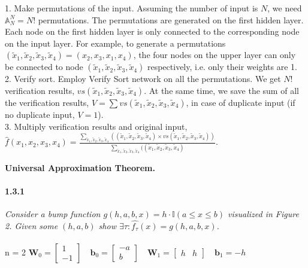 \documentclass{myhw}
\begin{document}
\begin{homeworkProblem}
\begin{homeworkSection}
1. Make permutations of the input. Assuming the number of input is $N$, we need $\mathbb{A}_N^N = N!$ permutations. The permutations are generated on the first hidden layer. Each node on the first hidden layer is only connected to the corresponding node on the input layer. For example, to generate a permutations $(\tilde{x}_1, \tilde{x}_2, \tilde{x}_3, \tilde{x}_4) = (x_2, x_3, x_1, x_4)$, the four nodes on the upper layer can only be connected to node $(\tilde{x}_1, \tilde{x}_2, \tilde{x}_3, \tilde{x}_4)$ respectively, i.e. only their weights are 1. \\
2. Verify sort. Employ Verify Sort network on all the permutations. We get $N!$ verification results, $vs(\tilde{x}_1, \tilde{x}_2, \tilde{x}_3, \tilde{x}_4)$. At the same time, we save the sum of all the verification results, $V = \sum vs(\tilde{x}_1, \tilde{x}_2, \tilde{x}_3, \tilde{x}_4)$, in case of duplicate input (if no duplicate input, $V = 1$).\\
3. Multiply verification results and original input, $\hat{f}(x_1, x_2, x_3, x_4) = \frac{\sum_{\tilde{x}_1, \tilde{x}_2, \tilde{x}_3, \tilde{x}_4}( (\tilde{x}_1, \tilde{x}_2, \tilde{x}_3, \tilde{x}_4) \times vs(\tilde{x}_1, \tilde{x}_2, \tilde{x}_3, \tilde{x}_4))}{\sum_{\tilde{x}_1, \tilde{x}_2, \tilde{x}_3, \tilde{x}_4}( (\tilde{x}_1, \tilde{x}_2, \tilde{x}_3, \tilde{x}_4)}$.
\end{homeworkSection}
\begin{homeworkSection}
\textbf{Universal Approximation Theorem.}
\paragraph{1.3.1} 
\emph{Consider a bump function $g(h,a,b,x)=h \cdot \mathbb{I} (a \leq x \leq b)$ visualized in Figure 2. Given some $(h, a, b)$ show $\exists \tau : \hat{f_\tau}(x)=g(h,a,b,x)$.} \\
\\
n = 2 \quad
$\textbf{W}_0 = \begin{bmatrix} 1\\ -1 \end{bmatrix} \quad 
\textbf{b}_0 = \begin{bmatrix} -a \\ b \end{bmatrix} \quad 
\textbf{W}_1 = \begin{bmatrix} h & h \end{bmatrix} \quad \textbf{b}_1 = -h$

\end{homeworkSection}
\end{homeworkProblem}
\end{document}
